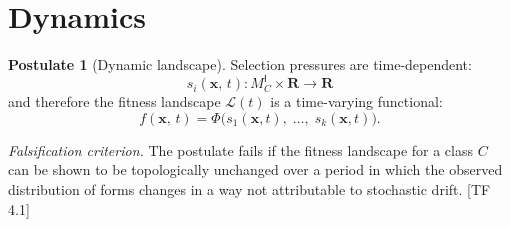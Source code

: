 \documentclass[10pt]{article}
\theoremstyle{definition}
\newtheorem{postulate}[definition]{Postulate}
\theoremstyle{plain}
\theoremstyle{remark}
\newcommand{\MC}{M^{\mathsf{I}}_C}          %
\providecommand{\R}{}
\renewcommand{\R}{\mathbf{R}}               %
\newcommand{\FitLand}{\mathcal{L}}           %
\newcommand{\TF}[1]{\textnormal{[TF\,#1]}}  %
\begin{document}
\newpage
\section{Dynamics}\label{sec:dynamics}

\begin{postulate}[Dynamic landscape]\label{post:4.1}
Selection pressures are time-dependent:
\[
  s_i(\bm{x},\, t) : \MC \times \R \longrightarrow \R
\]
and therefore the fitness landscape $\FitLand(t)$ is a time-varying
functional:
\[
  f(\bm{x},\, t) = \Phi\bigl(s_1(\bm{x}, t),\; \ldots,\;
  s_k(\bm{x}, t)\bigr).
\]

\medskip\noindent
\textit{Falsification criterion.}
The postulate fails if the fitness landscape for a class $C$ can be
shown to be topologically unchanged over a period in which the observed
distribution of forms changes in a way not attributable to stochastic
drift. \TF{4.1}
\end{postulate}
\end{document}
